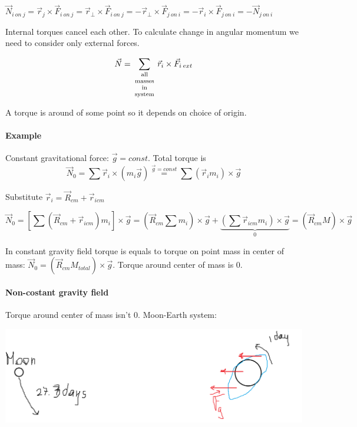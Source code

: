 $\vec{N}_{i\:on\:j} = \vec{r}_j \times \vec{F}_{i\:on\:j} = \vec{r}_{\perp} \times \vec{F}_{i\:on\:j}  = - \vec{r}_{\perp} \times \vec{F}_{j\:on\:i} = -\vec{r}_i  \times \vec{F}_{j\:on\:i}  = -\vec{N}_{j\:on\:i}$

Internal torques cancel each other. To calculate change in angular momentum we need to consider only external forces.

$$\vec{N} = \sum_{\parbox{1cm}{\scriptsize \centering all masses in system}} \vec{r}_i \times \vec{F}_{i\: ext}$$

A torque is around of some point so it depends on choice of origin.

\paragraph{Example} Constant gravitational force: $\vec{g} = const$. 
Total torque is $$\vec{N}_0 = \sum \vec{r}_i \times \left( m_i \vec{g} \right) \stackrel{\vec{g} = const}{=} \sum \left( \vec{r}_i m_i \right) \times \vec{g}$$

Substitute $\vec{r}_i = \vec{R}_{cm} + \vec{r}_{icm}$  

$$\vec{N}_0 = \left[ \sum \left( \vec{R}_{cm} + \vec{r}_{icm} \right)m_i  \right] \times \vec{g} = \left( \vec{R}_{cm} \sum m_i  \right) \times \vec{g} + \underbrace{\left( \sum  \vec{r}_{icm} m_i  \right) \times \vec{g}}_{0} = \left(\vec{R}_{cm} M \right) \times \vec{g} $$

In constant gravity field torque is equals to torque on point mass in center of mass: $\vec{N}_0 = \left( \vec{R}_{cm} M_{total}\right) \times \vec{g}$. Torque around center of mass is 0.
\paragraph{Non-costant gravity field} Torque around center of mass isn't 0. Moon-Earth system:

\begin{center}
	\includegraphics[width=\linewidth]{./lect14/pic3.png}
\end{center}

